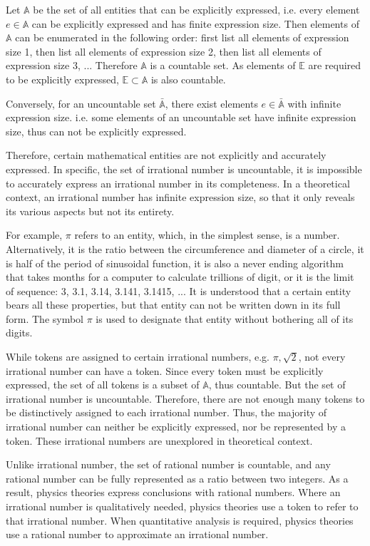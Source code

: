 \documentclass{amsart}
\theoremstyle{definition}
\theoremstyle{remark}
\numberwithin{equation}{section}
\begin{document}
Let $\mathbb{A}$ be the set of all entities that can be explicitly expressed, i.e. every element $e\in\mathbb{A}$ can be explicitly expressed and has finite expression size. Then elements of $\mathbb{A}$ can be enumerated in the following order: first list all elements of expression size 1, then list all elements of expression size 2, then list all elements of expression size 3, ... Therefore $\mathbb{A}$ is a countable set. As elements of $\mathbb{E}$ are required to be explicitly expressed, $\mathbb{E}\subset\mathbb{A}$ is also countable.

Conversely, for an uncountable set $\mathbb{\bar A}$, there exist elements $e\in\mathbb{\bar A}$ with infinite expression size. i.e. some elements of an uncountable set have infinite expression size, thus can not be explicitly expressed.

Therefore, certain mathematical entities are not explicitly and accurately expressed. In specific, the set of irrational number is uncountable, it is impossible to accurately express an irrational number in its completeness. In a theoretical context, an irrational number has infinite expression size, so that it only reveals its various aspects but not its entirety.

For example, $\pi$ refers to an entity, which, in the simplest sense, is a number. Alternatively, it is the ratio between the circumference and diameter of a circle, it is half of the period of sinusoidal function, it is also a never ending algorithm that takes months for a computer to calculate trillions of digit, or it is the limit of sequence: 3, 3.1, 3.14, 3.141, 3.1415, ... It is understood that a certain entity bears all these properties, but that entity can not be written down in its full form. The symbol $\pi$ is used to designate that entity without bothering all of its digits.

While tokens are assigned to certain irrational numbers, e.g. $\pi,\sqrt 2$, not every irrational number can have a token. Since every token must be explicitly expressed, the set of all tokens is a subset of $\mathbb{A}$, thus countable. But the set of irrational number is uncountable. Therefore, there are not enough many tokens to be distinctively assigned to each irrational number. Thus, the majority of irrational number can neither be explicitly expressed, nor be represented by a token. These irrational numbers are unexplored in theoretical context.

Unlike irrational number, the set of rational number is countable, and any rational number can be fully represented as a ratio between two integers. As a result, physics theories express conclusions with rational numbers. Where an irrational number is qualitatively needed, physics theories use a token to refer to that irrational number. When quantitative analysis is required, physics theories use a rational number to approximate an irrational number.
\end{document}
